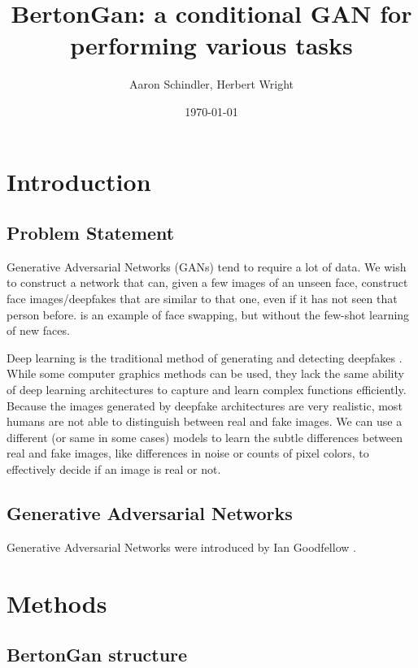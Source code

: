 \documentclass{article}
\title{BertonGan: a conditional GAN for performing various tasks}
\author{ Aaron Schindler, Herbert Wright }
\date{\today}
\begin{document}
\maketitle
\pagebreak

\section{Introduction}

\subsection{Problem Statement}

Generative Adversarial Networks (GANs) \cite{goodfellow2020generative} tend to require a lot of data. We
wish to construct a network that can, given a few images of an unseen face,
construct face images/deepfakes that are similar to that one, even if it has not
seen that person before. \cite{lin2020using} is an example of face swapping, but without the
few-shot learning of new faces.

Deep learning is the traditional method of generating and detecting deepfakes \cite{nguyen2022deep}.
While some computer graphics methods can be used, they lack the same ability
of deep learning architectures to capture and learn complex functions efficiently.
Because the images generated by deepfake architectures are very realistic, most
humans are not able to distinguish between real and fake images. We can
use a different (or same in some cases) models to learn the subtle differences
between real and fake images, like differences in noise or counts of pixel colors,
to effectively decide if an image is real or not.

\subsection{Generative Adversarial Networks}

Generative Adversarial Networks were introduced by Ian Goodfellow \cite{goodfellow2020generative}.


\section{Methods}

\subsection{BertonGan structure}
\end{document}

